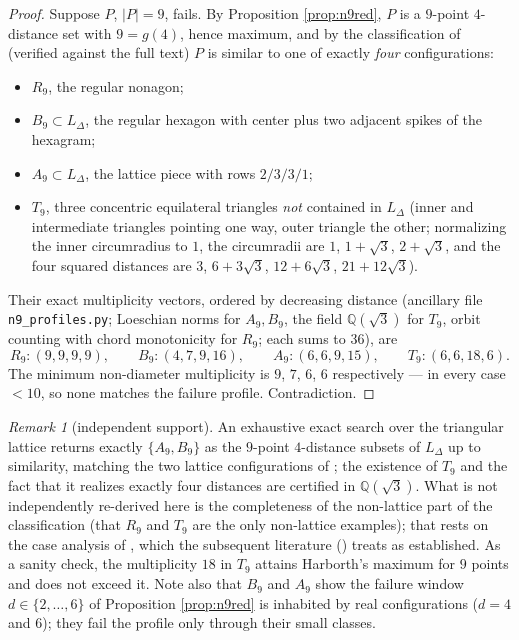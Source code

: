 \documentclass[11pt]{article}
\theoremstyle{definition}
\theoremstyle{remark}
\newtheorem{remark}[theorem]{Remark}
\newcommand{\Q}{\mathbb{Q}}
\newcommand{\Lat}{L_{\Delta}}
\begin{document}
\begin{proof}
Suppose $P$, $|P| = 9$, fails. By Proposition \ref{prop:n9red}, $P$ is a $9$-point
$4$-distance set with $9 = g(4)$, hence maximum, and by the classification of
\cite[Theorem~1 and Fig.~1]{ErFi96} (verified against the full text) $P$ is similar to
one of exactly \emph{four} configurations:
\begin{itemize}
\item $R_9$, the regular nonagon;
\item $B_9 \subset \Lat$, the regular hexagon with center plus two adjacent spikes of
the hexagram;
\item $A_9 \subset \Lat$, the lattice piece with rows $2/3/3/1$;
\item $T_9$, three concentric equilateral triangles \emph{not} contained in $\Lat$
(inner and intermediate triangles pointing one way, outer triangle the other;
normalizing the inner circumradius to $1$, the circumradii are $1$, $1+\sqrt3$,
$2+\sqrt3$, and the four squared distances are $3$, $6+3\sqrt3$, $12+6\sqrt3$,
$21+12\sqrt3$).
\end{itemize}
Their exact multiplicity vectors, ordered by decreasing distance (ancillary file
\texttt{n9\_profiles.py}; Loeschian norms for $A_9, B_9$, the field $\Q(\sqrt3)$ for
$T_9$, orbit counting with chord monotonicity for $R_9$; each sums to $36$), are
\[
R_9 : (9,9,9,9), \qquad B_9 : (4,7,9,16), \qquad A_9 : (6,6,9,15), \qquad
T_9 : (6,6,18,6).
\]
The minimum non-diameter multiplicity is $9$, $7$, $6$, $6$ respectively --- in every
case $< 10$, so none matches the failure profile. Contradiction.
\end{proof}

\begin{remark}[independent support]\label{rem:n9support}
An exhaustive exact search over the triangular lattice returns exactly $\{A_9, B_9\}$
as the $9$-point $4$-distance subsets of $\Lat$ up to similarity, matching the two
lattice configurations of \cite[Fig.~1]{ErFi96}; the existence of $T_9$ and the fact
that it realizes exactly four distances are certified in $\Q(\sqrt3)$. What is not
independently re-derived here is the completeness of the non-lattice part of the
classification (that $R_9$ and $T_9$ are the only non-lattice examples); that rests on
the case analysis of \cite{ErFi96}, which the subsequent literature
(\cite{Shinohara08,Wei12,LanWei13}) treats as established. As a sanity check, the
multiplicity $18$ in $T_9$ attains Harborth's maximum for $9$ points and does not
exceed it. Note also that $B_9$ and $A_9$ show the failure window $d \in \{2,\dots,6\}$
of Proposition \ref{prop:n9red} is inhabited by real configurations ($d = 4$ and $6$);
they fail the profile only through their small classes.
\end{remark}
\end{document}
